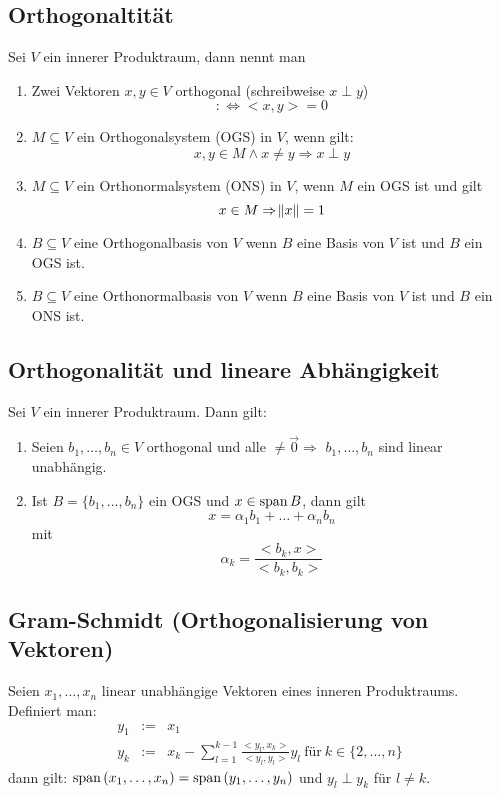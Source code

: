 \subsection{Orthogonaltität}
Sei $V$ ein innerer Produktraum, dann nennt man
\begin{enumerate}[label= (\alph*)]
	\item Zwei Vektoren $x,y \in V$ orthogonal (schreibweise $x \perp y$)
		\begin{equation*}
			:\Leftrightarrow <x,y> = 0
		\end{equation*}
	\item $M \subseteq V$ ein Orthogonalsystem (OGS) in $V$, wenn gilt:
		\begin{equation*}
			x,y \in M \land x \neq y \Rightarrow x \perp y
		\end{equation*}
	\item $M \subseteq V$ ein Orthonormalsystem (ONS) in $V$, wenn $M$ ein OGS ist
		und gilt
		\begin{equation*}
			x \in M \Rightarrow \norm{x} = 1
		\end{equation*}
	\item $B \subseteq V$ eine Orthogonalbasis von $V$ wenn $B$ eine Basis von 
		$V$ ist und $B$ ein OGS ist.
	\item $B \subseteq V$ eine Orthonormalbasis von $V$ wenn $B$ eine Basis von
		$V$ ist und $B$ ein ONS ist.
\end{enumerate}

\subsection{Orthogonalität und lineare Abhängigkeit}
Sei $V$ ein innerer Produktraum. Dann gilt:
\begin{enumerate}[label= (\alph*)]
	\item Seien $b_1, \ldots, b_n \in V$ orthogonal und alle $\neq \vec{0} \Rightarrow$
		$b_1, \ldots, b_n$ sind linear unabhängig.
	\item Ist $B = \{b_1, \ldots, b_n\}$ ein OGS und $x \in \operatorname{span}{B}$, dann gilt
		\begin{equation*}
			x = \alpha_1 b_1 + \ldots + \alpha_n b_n
		\end{equation*}
		mit
		\begin{equation*}
			\alpha_k = \frac{<b_k, x>}{<b_k, b_k>}
		\end{equation*}
\end{enumerate}

\subsection{Gram-Schmidt (Orthogonalisierung von Vektoren)}
Seien $x_1, \ldots, x_n$ linear unabhängige Vektoren eines inneren Produktraums.
Definiert man:
\begin{eqnarray*}
	y_1 &:=& x_1 \\
	y_k &:=& x_k - \sum_{l=1}^{k-1} \frac{<y_l, x_k>}{<y_l, y_l>} y_l\  \text{für}\ 
	k\in\{2, \ldots, n\}
\end{eqnarray*}
dann gilt: $\operatorname{span}{(x_1, \ldots, x_n)} = \operatorname{span}{(y_1, \ldots, y_n)}$ und $y_l \perp y_k$
für $l \neq k$.

